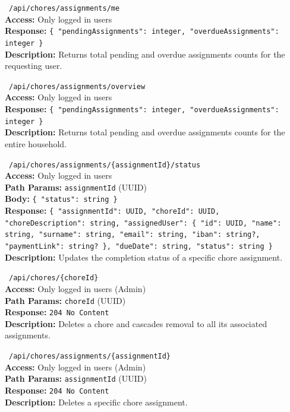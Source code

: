 \vspace{0.3cm}
\noindent \apiGET\ \texttt{/api/chores/assignments/me} \\
\textbf{Access:} Only logged in users \\
\textbf{Response:} \texttt{\{ "pendingAssignments": integer, "overdueAssignments": integer \}} \\
\textbf{Description:} Returns total pending and overdue assignments counts for the requesting user.

\vspace{0.3cm}
\noindent \apiGET\ \texttt{/api/chores/assignments/overview} \\
\textbf{Access:} Only logged in users \\
\textbf{Response:} \texttt{\{ "pendingAssignments": integer, "overdueAssignments": integer \}} \\
\textbf{Description:} Returns total pending and overdue assignments counts for the entire household.

\vspace{0.3cm}
\noindent \apiPATCH\ \texttt{/api/chores/assignments/\{assignmentId\}/status} \\
\textbf{Access:} Only logged in users \\
\textbf{Path Params:} \texttt{assignmentId} (UUID) \\
\textbf{Body:} \texttt{\{ "status": string \}} \\
\textbf{Response:} \texttt{\{ "assignmentId": UUID, "choreId": UUID, "choreDescription": string, "assignedUser": \{ "id": UUID, "name": string, "surname": string, "email": string, "iban": string?, "paymentLink": string? \}, "dueDate": string, "status": string \}} \\
\textbf{Description:} Updates the completion status of a specific chore assignment.

\vspace{0.3cm}
\noindent \apiDELETE\ \texttt{/api/chores/\{choreId\}} \\
\textbf{Access:} Only logged in users (Admin) \\
\textbf{Path Params:} \texttt{choreId} (UUID) \\
\textbf{Response:} \texttt{204 No Content} \\
\textbf{Description:} Deletes a chore and cascades removal to all its associated assignments.

\vspace{0.3cm}
\noindent \apiDELETE\ \texttt{/api/chores/assignments/\{assignmentId\}} \\
\textbf{Access:} Only logged in users (Admin) \\
\textbf{Path Params:} \texttt{assignmentId} (UUID) \\
\textbf{Response:} \texttt{204 No Content} \\
\textbf{Description:} Deletes a specific chore assignment.

